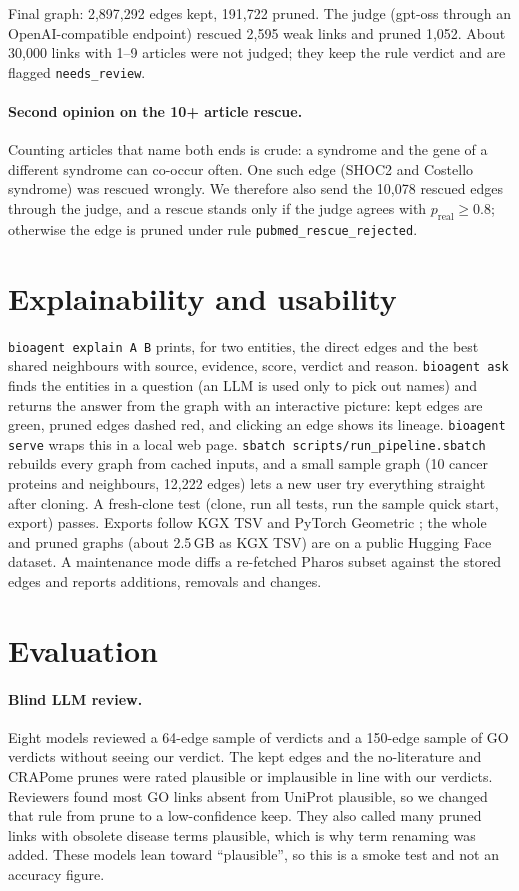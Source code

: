 \documentclass[11pt]{article}
\begin{document}
Final graph: 2,897,292 edges kept, 191,722 pruned. The judge (gpt-oss through an OpenAI-compatible endpoint) rescued 2,595 weak links and pruned 1,052. About 30,000 links with 1--9 articles were not judged; they keep the rule verdict and are flagged \texttt{needs\_review}.

\paragraph{Second opinion on the 10+ article rescue.} Counting articles that name both ends is crude: a syndrome and the gene of a different syndrome can co-occur often. One such edge (SHOC2 and Costello syndrome) was rescued wrongly. We therefore also send the 10,078 rescued edges through the judge, and a rescue stands only if the judge agrees with $p_{\mathrm{real}}\ge 0.8$; otherwise the edge is pruned under rule \texttt{pubmed\_rescue\_rejected}.
\par\smallskip\noindent

\section{Explainability and usability}
\texttt{bioagent explain A B} prints, for two entities, the direct edges and the best shared neighbours with source, evidence, score, verdict and reason. \texttt{bioagent ask} finds the entities in a question (an LLM is used only to pick out names) and returns the answer from the graph with an interactive picture: kept edges are green, pruned edges dashed red, and clicking an edge shows its lineage. \texttt{bioagent serve} wraps this in a local web page. \texttt{sbatch scripts/run\_pipeline.sbatch} rebuilds every graph from cached inputs, and a small sample graph (10 cancer proteins and neighbours, 12,222 edges) lets a new user try everything straight after cloning. A fresh-clone test (clone, run all tests, run the sample quick start, export) passes. Exports follow KGX TSV and PyTorch Geometric \cite{pyg}; the whole and pruned graphs (about 2.5\,GB as KGX TSV) are on a public Hugging Face dataset. A maintenance mode diffs a re-fetched Pharos subset against the stored edges and reports additions, removals and changes.

\section{Evaluation}
\paragraph{Blind LLM review.} Eight models reviewed a 64-edge sample of verdicts and a 150-edge sample of GO verdicts without seeing our verdict. The kept edges and the no-literature and CRAPome prunes were rated plausible or implausible in line with our verdicts. Reviewers found most GO links absent from UniProt plausible, so we changed that rule from prune to a low-confidence keep. They also called many pruned links with obsolete disease terms plausible, which is why term renaming was added. These models lean toward ``plausible'', so this is a smoke test and not an accuracy figure.
\end{document}
